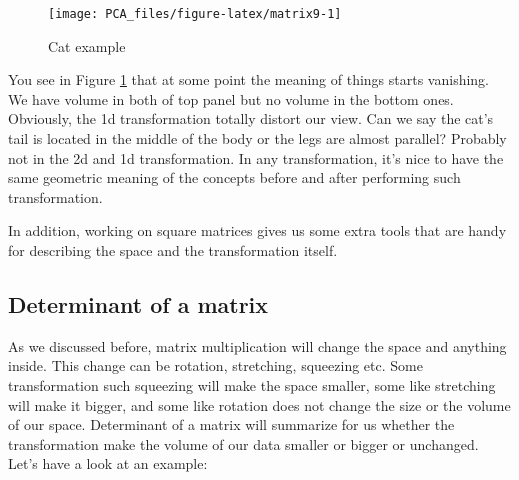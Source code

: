 \documentclass[
]{book}
\theoremstyle{definition}
\theoremstyle{definition}
\theoremstyle{definition}
\theoremstyle{remark}
\begin{document}
\begin{figure}

{\centering \texttt{[image: PCA\_files/figure-latex/matrix9-1]} 

}

\caption{Cat example}\label{fig:matrix9}
\end{figure}

You see in Figure \ref{fig:matrix9} that at some point the meaning of things starts vanishing. We have volume in both of top panel but no volume in the bottom ones. Obviously, the 1d transformation totally distort our view. Can we say the cat's tail is located in the middle of the body or the legs are almost parallel? Probably not in the 2d and 1d transformation. In any transformation, it's nice to have the same geometric meaning of the concepts before and after performing such transformation.

In addition, working on square matrices gives us some extra tools that are handy for describing the space and the transformation itself.

\hypertarget{determinant-of-a-matrix}{%
\subsection{Determinant of a matrix}\label{determinant-of-a-matrix}}

As we discussed before, matrix multiplication will change the space and anything inside. This change can be rotation, stretching, squeezing etc. Some transformation such squeezing will make the space smaller, some like stretching will make it bigger, and some like rotation does not change the size or the volume of our space. Determinant of a matrix will summarize for us whether the transformation make the volume of our data smaller or bigger or unchanged. Let's have a look at an example:
\end{document}
